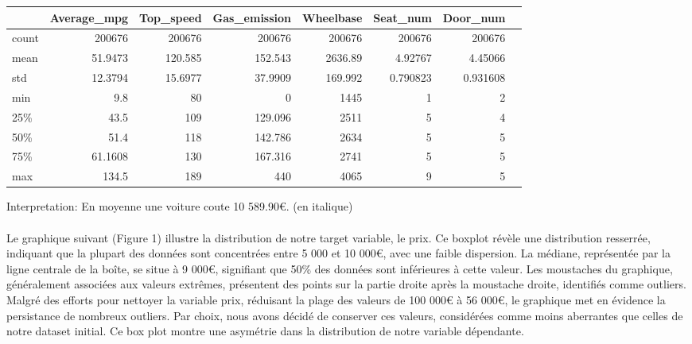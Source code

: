 \documentclass[12pt]{article}
\begin{document}
\begin{table}[h]
    \centering
    \begin{tabular}{lrrrrrrr}
    \toprule
           & Average\_mpg & Top\_speed & Gas\_emission & Wheelbase & Seat\_num & Door\_num \\
    \midrule
     count & 200676 & 200676 & 200676 & 200676 & 200676 & 200676 \\
     mean & 51.9473 & 120.585 & 152.543 & 2636.89 & 4.92767 & 4.45066 \\
     std & 12.3794 & 15.6977 & 37.9909 & 169.992 & 0.790823 & 0.931608 \\
     min & 9.8 & 80 & 0 & 1445 & 1 & 2 \\
     25\% & 43.5 & 109 & 129.096 & 2511 & 5 & 4 \\
     50\% & 51.4 & 118 & 142.786 & 2634 & 5 & 5 \\
     75\% & 61.1608 & 130 & 167.316 & 2741 & 5 & 5 \\
     max & 134.5 & 189 & 440 & 4065 & 9 & 5 \\
    \bottomrule
    \end{tabular}
\end{table}

\FloatBarrier

\noindent Interpretation: En moyenne une voiture coute 10 589.90€. (en italique) \\

\\

\noindent Le graphique suivant (Figure 1) illustre la distribution de notre target variable, le prix. Ce boxplot révèle une distribution resserrée, indiquant que la plupart des données sont concentrées entre 5 000 et 10 000€, avec une faible dispersion. La médiane, représentée par la ligne centrale de la boîte, se situe à 9 000€, signifiant que 50\% des données sont inférieures à cette valeur.
\noindent Les moustaches du graphique, généralement associées aux valeurs extrêmes, présentent des points sur la partie droite après la moustache droite, identifiés comme outliers. Malgré des efforts pour nettoyer la variable prix, réduisant la plage des valeurs de 100 000€ à 56 000€, le graphique met en évidence la persistance de nombreux outliers. Par choix, nous avons décidé de conserver ces valeurs, considérées comme moins aberrantes que celles de notre dataset initial.
\noindent Ce box plot montre une asymétrie dans la distribution de notre variable dépendante.
\end{document}
